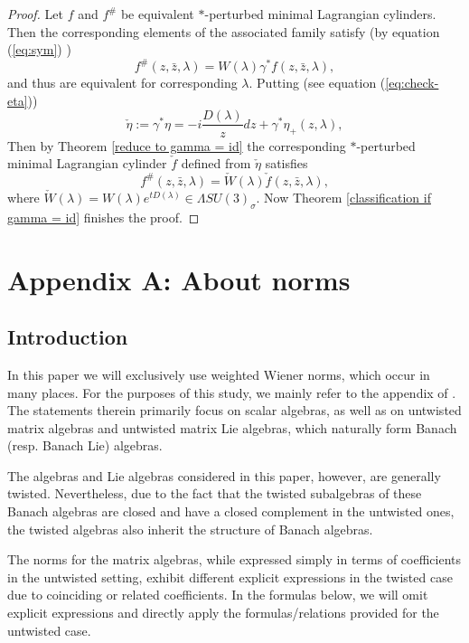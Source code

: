 \documentclass[a4paper,11pt]{amsart}
\theoremstyle{definition}
\numberwithin{equation}{section}
\begin{document}
\begin{proof} 
Let $f$ and $f^{\#}$ be equivalent $*$-perturbed minimal Lagrangian cylinders. Then the corresponding elements
of the associated family satisfy  (by equation (\ref{eq:sym}) )
\begin{equation}
f^{\#}(z,\bar{z},\lambda)=W(\lambda) \gamma^*f( z, \bar{z}, \lambda),
\end{equation} 
and thus are equivalent for corresponding $\lambda$.
\newline Putting  (see equation (\ref{eq:check-eta}))
\begin{equation*}
\check{\eta}:=\gamma^*\eta=-i\frac{D(\lambda)}{z}dz+\gamma^*\eta_{+}(z,\lambda),
\end{equation*}
Then by Theorem \ref{reduce to gamma = id}   the corresponding  $*$-perturbed minimal Lagrangian cylinder $\check{f}$ defined from $\check{\eta}$
satisfies 
\begin{equation} \label{nogamma}
f^{\#}(z,\bar{z},\lambda)=\check{W}(\lambda)\check{f}(z,\bar{z},\lambda),
\end{equation}
where  $\check{W}(\lambda)=W(\lambda) e^{tD(\lambda)}\in \Lambda SU(3)_{\sigma}$. 
Now Theorem \ref{classification if gamma = id} finishes the proof.
\end{proof} 

\section{Appendix A: About norms}
\subsection{Introduction}  In this paper we will exclusively use weighted Wiener norms,
which occur in many places. For the purposes of this study, we mainly refer to 
the appendix of \cite{GoWa}.
The statements therein primarily focus on scalar algebras, as well as on 
untwisted matrix algebras and untwisted  matrix Lie algebras,
which naturally form Banach (resp. Banach Lie) algebras.

The algebras and Lie algebras considered in this paper, however, are generally twisted.
Nevertheless,  due to the fact that the twisted subalgebras of these Banach algebras are closed and have a closed complement in the untwisted ones, the twisted algebras also inherit the structure of Banach algebras.



The norms for the matrix algebras, while expressed simply in terms of coefficients in the untwisted setting, exhibit different explicit expressions in the twisted case due to coinciding or related coefficients.
In the formulas below, we will omit explicit expressions and directly apply the formulas/relations provided for the untwisted case.
\end{document}
